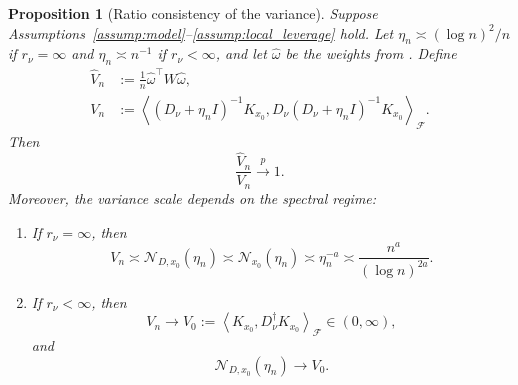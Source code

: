 \documentclass[11pt]{article}
\newtheorem{proposition}{Proposition}[section]
\newcommand{\F}{\mathcal{F}}
\newcommand{\Ncal}{\mathcal{N}}
\newcommand{\inner}[2]{\left\langle #1,#2\right\rangle}
\begin{document}
\begin{proposition}[Ratio consistency of the variance]\label{prop:variance_consistency}
Suppose Assumptions~\ref{assump:model}--\ref{assump:local_leverage} hold. Let $\eta_n\asymp (\log n)^2/n$ if $r_\nu=\infty$ and $\eta_n\asymp n^{-1}$ if $r_\nu<\infty$, and let $\widehat\omega$ be the weights from . Define
\begin{align}
  \widehat V_n&:=\frac1n\widehat\omega^\top W\widehat\omega,
  \label{eq:Vhat_def}\\
  V_n&:=\inner{(D_\nu+\eta_nI)^{-1}K_{x_0}}
  {D_\nu(D_\nu+\eta_nI)^{-1}K_{x_0}}_{\F}.
  \label{eq:V_def}
\end{align}
Then
\begin{equation}
  \frac{\widehat V_n}{V_n}\overset p\longrightarrow1.
  \label{eq:variance_consistency}
\end{equation}
Moreover, the variance scale depends on the spectral regime:
\begin{enumerate}[label=(\roman*),leftmargin=2.2em]
  \item If $r_\nu=\infty$, then
  \begin{equation}
    V_n\asymp\Ncal_{D,x_0}(\eta_n)\asymp\Ncal_{x_0}(\eta_n)\asymp\eta_n^{-a}\asymp \frac{n^a}{(\log n)^{2a}}.
    \label{eq:V_scale}
  \end{equation}

  \item If $r_\nu<\infty$, then
  \begin{equation}
    V_n
    \longrightarrow
    V_0
    :=
    \inner{K_{x_0}}{D_\nu^\dagger K_{x_0}}_{\F}
    \in(0,\infty),
    \label{eq:V_scale_finite}
  \end{equation}
  and
  \[
    \Ncal_{D,x_0}(\eta_n)\longrightarrow V_0.
  \]
\end{enumerate}
\end{proposition}
\end{document}
